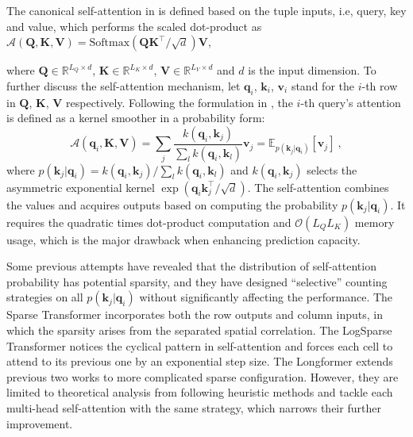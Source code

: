 \documentclass[letterpaper]{article} %
\newcommand{\mb}{\mathbf}
\newcommand{\bigO}{\mathcal{O}}
\begin{document}
The canonical self-attention in \cite{vaswani2017attention} is defined based on the tuple inputs, i.e, query, key and value, which performs the scaled dot-product as $\mathcal{A} (\mb{Q}, \mb{K}, \mb{V}) = \textrm{Softmax} ({\mb{Q}\mb{K}^{\top}}/{\sqrt{d}})\mb{V}$,

where $\mb{Q} \in \mathbb{R}^{L_Q \times d}$, $\mb{K} \in \mathbb{R}^{L_K \times d}$, $\mb{V} \in \mathbb{R}^{L_V \times d}$ and $d$ is the input dimension.
To further discuss the self-attention mechanism, let $\mb{q}_{i}$, $\mb{k}_{i}$, $\mb{v}_{i}$ stand for the $i$-th row in $\mb{Q}$, $\mb{K}$, $\mb{V}$ respectively. Following the formulation in \cite{tsai2019transformer}, the $i$-th query's attention is defined as a kernel smoother in a probability form:
\begin{equation}\label{eq:method.prob.Attention}
    \mathcal{A} (\mb{q}_i, \mb{K}, \mb{V}) = \sum_{j} \frac{k(\mb{q}_i, \mb{k}_j)}{\sum_{l} k(\mb{q}_i, \mb{k}_l)} \mb{v}_{j} = \mathbb{E}_{p(\mb{k}_j|\mb{q}_i)} [\mb{v}_j] ~,
\end{equation}
where $p(\mb{k}_j|\mb{q}_i) = {k(\mb{q}_i, \mb{k}_j)}/{\sum_{l} k(\mb{q}_i, \mb{k}_l)}$ and $k(\mb{q}_i, \mb{k}_j)$ selects the asymmetric
exponential kernel $\exp ({\mb{q}_i \mb{k}_j^{\top}}/{\sqrt{d}})$.
The self-attention combines the values and acquires outputs based on computing the probability $p(\mb{k}_j|\mb{q}_i)$. It requires the quadratic times dot-product computation and $\bigO(L_Q L_K)$ memory usage, which is the major drawback when enhancing prediction capacity.

Some previous attempts have revealed that the distribution of self-attention probability has potential sparsity, and they have designed ``selective'' counting strategies on all $p(\mb{k}_j|\mb{q}_i)$ without significantly affecting the performance.
The Sparse Transformer \cite{child2019generating} incorporates both the row outputs and column inputs, in which the sparsity arises from the separated spatial correlation. The LogSparse Transformer \cite{li2019enhancing} notices the cyclical pattern in self-attention and forces each cell to attend to its previous one by an exponential step size.
The Longformer \cite{DBLP:journals/corr/abs-2004-05150} extends previous two works to more complicated sparse configuration.
However, they are limited to theoretical analysis from following heuristic methods and tackle each multi-head self-attention with the same strategy, which narrows their further improvement.
\end{document}
